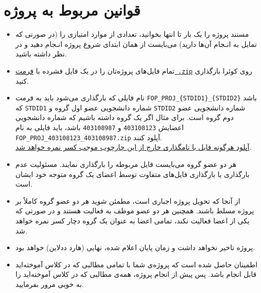 \section{قوانین مربوط به پروژه}

\begin{itemize}
    \item {
        مستند پروژه را یک بار تا انتها بخوانید، تعدادی از موارد امتیازی را (در صورتی که تمایل به انـجام آن‌ها دارید) می‌بایست از همان ابتدای شروع پروژه انـجام دهید و در نظر داشته باشید.
    }
    \item {
        تمام فایل‌های پروژه‌تان را در یک فایل فشرده با \underline{فرمت \,\texttt{.zip}}  روی کوئرا بارگذاری کنید.
    }
    \item {
        نام فایلی که بارگذاری می‌شود باید به فرمت \texttt{FOP\_PROJ\_\{STDID1\}\_\{STDID2\}} باشد که \texttt{STDID1} شماره دانشجویی عضو اول گروه و \texttt{STDID2} شماره دانشجویی عضو دوم گروه است.
        برای مثال اگر یک گروه داشته باشیم که شماره دانشجویی اعضایش \texttt{403108123} و \texttt{403108987} باشد،
        باید فایلی به نام \texttt{FOP\_PROJ\_403108123\_403108987.zip} آپلود کنند.\\
        {\large \underline{آپلود هرگونه فایل با نامگذاری خارج از این چارچوب موجب کسر نمره خواهد شد}.}
    }
    \item {
        هر دو عضو گروه می‌بایست فایل مربوطه را بارگذاری نمایند. مسئولیت عدم بارگذاری یا بارگذاری فایل‌های متفاوت توسط اعضای یک گروه متوجه خود ایشان است.
    }
    \item {
        از آنجا که تحویل پروژه اجباری است، مطمئن شوید هر دو عضو گروه کاملاً بر پروژه مسلط باشند. همچنین هر دو عضو موظف به فعالیت هستند و در صورتی که یکی از اعضا فعالیت نکند، تمامی اعضا به عنوان یک گروه دچار کسر نمره خواهد شد.
    }
    \item {
        پروژه تاخیر نخواهد داشت و زمان پایان اعلام شده، نهایی (هارد ددلاین) خواهد بود.
    }
    \item {
        اطمینان حاصل شده است که پروژه‌ی شما با تمامی مطالبی که در کلاس آموخته‌اید قابل انجام باشد. پس پیش از انجام پروژه، همه‌ی مطالبی که در کلاس آموخته‌اید را به خوبی مرور بفرمایید.
    }
\end{itemize}